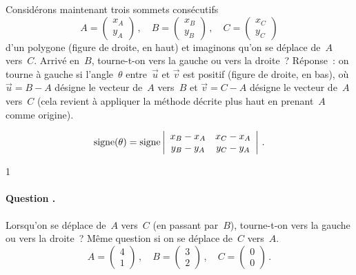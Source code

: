 \documentclass[11pt]{article}
\newcounter{question_counter}
\newcommand{\question}{\addtocounter{question_counter}1 %
    \paragraph{\bf Question \arabic{question_counter}.}}
\begin{document}
Considérons maintenant trois sommets consécutifs 
$$A = \left(\begin{array}{c} x_A \\ y_A\end{array}\right)\,,\quad
  B = \left(\begin{array}{c} x_B \\ y_B\end{array}\right)\,,\quad
  C = \left(\begin{array}{c} x_C \\ y_C\end{array}\right)$$
d'un polygone (figure de droite, en haut) et imaginons qu'on se déplace de~$A$ vers~$C$.
Arrivé en~$B$, tourne-t-on vers la gauche ou vers la droite~?
Réponse~: on tourne à gauche si l'angle~$\theta$ entre~$\vec u$ et
$\vec v$ est positif (figure de droite, en bas), où
$\vec u = B - A$ désigne le vecteur de~$A$ vers~$B$ et 
$\vec v = C - A$ désigne le vecteur de~$A$ vers~$C$ (cela revient 
à appliquer la méthode décrite plus haut en prenant~$A$ comme origine).

$$\mathop{\mbox{\rm signe}}(\theta) =
  \mathop{\mbox{\rm signe}} \left|\begin{array}{cc} 
        x_B - x_A & x_C - x_A \\ 
        y_B - y_A & y_C - y_A 
                            \end{array}\right|\,.$$

\question
Lorsqu'on se déplace de~$A$ vers~$C$ (en passant par~$B$),
tourne-t-on vers la gauche ou vers la droite~? Même question
si on se déplace de~$C$ vers~$A$.
$$A = \left(\begin{array}{c} 4 \\ 1\end{array}\right)\,,\quad
  B = \left(\begin{array}{c} 3 \\ 2\end{array}\right)\,,\quad
  C = \left(\begin{array}{c} 0 \\ 0\end{array}\right)\,.$$
\end{document}
